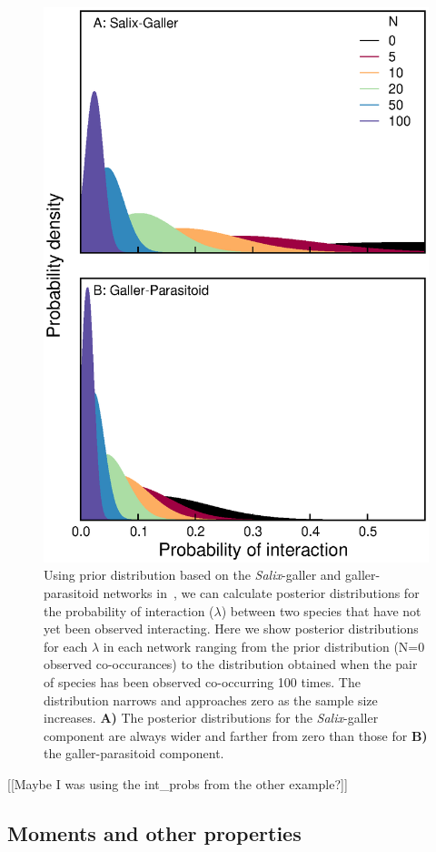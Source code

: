 \documentclass[12pt]{article}
\begin{document}
      \begin{figure}[ht]
        \label{Salix_pdfs}
        \caption{Using prior distribution based on the \emph{Salix}-galler and galler-parasitoid networks in~\citet{Barbour2016}, we can calculate posterior distributions for the probability of interaction ($\lambda$) between two species that have not yet been observed interacting. Here we show posterior distributions for each $\lambda$ in each network ranging from the prior distribution (N=0 observed co-occurances) to the distribution obtained when the pair of species has been observed co-occurring 100 times. The distribution narrows and approaches zero as the sample size increases. \textbf{A)} The posterior distributions for the \emph{Salix}-galler component are always wider and farther from zero than those for \textbf{B)} the galler-parasitoid component.}
        \includegraphics*[width=.8\textwidth]{figures/Salix_Galler_pdfs_increasing_N.eps}
        \end{figure}
        [[Maybe I was using the int_probs from the other example?]]

    \subsection*{Moments and other properties}
\end{document}
